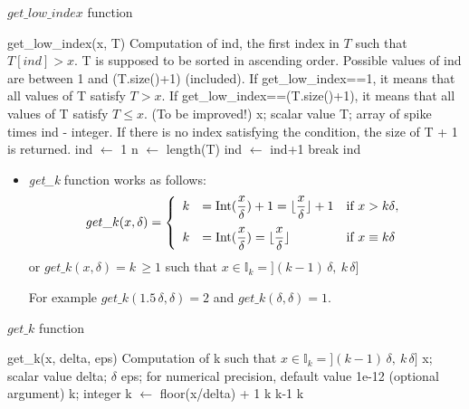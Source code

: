 \documentclass{article}
\newcommand{\be}{\begin{eqnarray*}}
\newcommand{\ee}{\end{eqnarray*}}
\newcommand{\dsp}{\displaystyle}
\def\Ik{\mathbb{I}_k}
\begin{document}
\begin{algorithm}[!h]
\caption{$get\_low\_index$ function}
\begin{algorithmic}[1] 
\Use get\_low\_index(x, T)
\Desc Computation of ind, the first index in $T$ such that $T[ind]> x$. T is supposed to be sorted in ascending order. Possible values of ind are between 1 and (T.size()+1) (included). If get\_low\_index==1, it means  that all values of T satisfy $T>x$. If get\_low\_index==(T.size()+1), it means  that all values of T satisfy $T\leq x$. (To be improved!)
  \Input x; scalar value
\Input T; array of spike times
  \Output ind - integer. If there is no index satisfying the condition, the size of T + 1 is returned.
\State ind $\gets$ 1
\State n $\gets$ length(T)
\State ind $\gets$ ind+1
\Else
\State break
\EndIf
\EndWhile
\State \Return ind
\end{algorithmic}
\end{algorithm}


\begin{itemize}
\item \textit{get\_k} function works as follows:
\be
get\_k(x, \delta) = \left\{
\begin{array}{lll}
k&= \hbox{Int}(\dsp\frac{x}{\delta})+1 = \lfloor\dsp\frac{x}{\delta} \rfloor+1 &\hbox{if } {x > k\delta},\\[10pt]
k &= \hbox{Int}(\dsp\frac{x}{\delta}) = \lfloor\dsp\frac{x}{\delta} \rfloor &\hbox{if }{x \equiv k\delta}
\end{array}
\right.
\ee
or $get\_k(x,\delta) = k\, \geq 1$ such that $x \in \Ik=]{(k-1)}\,\delta,\:k\,\delta]$

For example $get\_k(1.5\,\delta, \delta)= 2$ and $get\_k(\delta, \delta)= 1$.
\end{itemize}

\begin{algorithm}[!h]
\caption{$get\_k$ function}
\begin{algorithmic}[1] 
\Use get\_k(x, delta, eps)
  \Desc Computation of k such that $x \in \Ik=]{(k-1)}\,\delta,\:k\,\delta]$
  \Input x; scalar value
\Input delta; $\delta$
\Input eps; for numerical precision, default value 1e-12 (optional argument)
\Output k; integer
\State k $\gets$ floor(x/delta) + 1
\State \Return k
\EndIf
{}
\State \Return k-1
\EndIf
\State \Return k
\end{algorithmic}
\end{algorithm}
\end{document}
